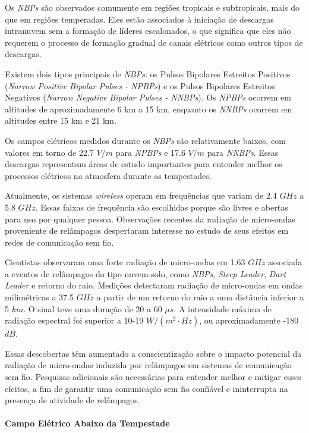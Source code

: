 \documentclass[a4paper, 12pt, onecolumn,singlespacing]{article}
\begin{document}
	Os \textit{NBPs} são observados comumente em regiões tropicais e subtropicais, mais do que em regiões temperadas. Eles estão associados à iniciação de descargas intranuvem sem a formação de líderes escalonados, o que significa que eles não requerem o processo de formação gradual de canais elétricos como outros tipos de descargas.
	
	Existem dois tipos principais de \textit{NBPs}: os Pulsos Bipolares Estreitos Positivos (\textit{Narrow Positive Bipolar Pulses - NPBPs}) e os Pulsos Bipolares Estreitos Negativos (\textit{Narrow Negative Bipolar Pulses - NNBPs}). Os \textit{NPBPs} ocorrem em altitudes de aproximadamente 6 km a 15 km, enquanto os \textit{NNBPs} ocorrem em altitudes entre 15 km e 21 km.
	
	Os campos elétricos medidos durante os \textit{NBPs} são relativamente baixos, com valores em torno de 22.7 $V/m$ para \textit{NPBPs} e 17.6 $V/m$ para \textit{NNBPs}. Essas descargas representam áreas de estudo importantes para entender melhor os processos elétricos na atmosfera durante as tempestades.
	
	Atualmente, os sistemas \textit{wireless} operam em frequências que variam de 2.4 $GHz$ a 5.8 $GHz$. Essas faixas de frequência são escolhidas porque são livres e abertas para uso por qualquer pessoa. Observações recentes da radiação de micro-ondas proveniente de relâmpagos despertaram interesse no estudo de seus efeitos em redes de comunicação sem fio.
	
	Cientistas observaram uma forte radiação de micro-ondas em 1.63 $GHz$ associada a eventos de relâmpagos do tipo nuvem-solo, como \textit{NBPs}, \textit{Steep Leader}, \textit{Dart Leader} e retorno do raio. Medições detectaram radiação de micro-ondas em ondas milimétricas a 37.5 $GHz$ a partir de um retorno do raio a uma distância inferior a 5 $km$. O sinal teve uma duração de 20 a 60 $\mu s$. A intensidade máxima de radiação espectral foi superior a 10-19 $W/(m^2·Hz)$, ou aproximadamente -180 $dB$.
	
	Essas descobertas têm aumentado a conscientização sobre o impacto potencial da radiação de micro-ondas induzida por relâmpagos em sistemas de comunicação sem fio. Pesquisas adicionais são necessárias para entender melhor e mitigar esses efeitos, a fim de garantir uma comunicação sem fio confiável e ininterrupta na presença de atividade de relâmpagos.
	
	\paragraph{Campo Elétrico Abaixo da Tempestade}
	
\end{document}
